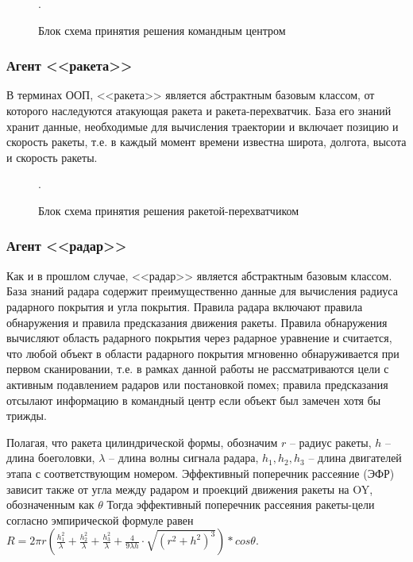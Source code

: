 \begin{figure*}[h!]
	\caption{Блок схема принятия решения командным центром}.
\end{figure*} 


\subsubsection{Агент <<ракета>>}

В терминах ООП,  <<ракета>> является абстрактным базовым классом, от которого наследуются атакующая ракета и ракета-перехватчик. База его знаний хранит данные, необходимые для вычисления траектории и включает позицию и скорость ракеты, т.е. в каждый момент времени известна широта, долгота, высота и скорость ракеты. 

\begin{figure*}[h!]
	\caption{Блок схема принятия решения ракетой-перехватчиком}.
\end{figure*} 


\subsubsection{Агент <<радар>>}

Как и в прошлом случае, <<радар>> является абстрактным базовым классом. База знаний радара содержит преимущественно данные для вычисления радиуса радарного покрытия и угла покрытия.   Правила радара включают правила обнаружения и правила предсказания движения ракеты. Правила обнаружения вычисляют область радарного покрытия через радарное уравнение и считается, что любой объект в области радарного покрытия мгновенно обнаруживается при первом сканировании, т.е. в рамках данной работы не рассматриваются цели с активным подавлением радаров или постановкой помех; правила предсказания отсылают информацию в командный центр если объект был замечен хотя бы трижды. 

Полагая, что ракета цилиндрической формы, обозначим $r$ -- радиус ракеты, $h$ -- длина боеголовки, $\lambda$  -- длина волны сигнала радара, $h_1, h_2, h_3$ -- длина двигателей этапа с соответствующим номером. Эффективный поперечник рассеяние (ЭФР) зависит также от угла между радаром и проекций  движения ракеты на  OY, обозначенным как $\theta$ Тогда эффективный поперечник рассеяния ракеты-цели согласно эмпирической формуле равен $R = 2 \pi r (\frac{h_1^2}{\lambda} + \frac{h_2^2}{\lambda} + \frac{h_3^2}{\lambda} + \frac{4}{9 \lambda h} \cdot \sqrt{(r^2+h^2)^3} ) * cos \theta$.

